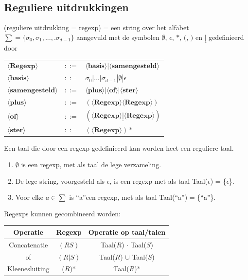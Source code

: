 \documentclass{report}
\begin{document}
\subsection{Reguliere uitdrukkingen}
(reguliere uitdrukking = regexp) = een string over het alfabet $\sum = \{\sigma_0, \sigma_1, ..., .\sigma_{d - 1}\}$ aangevuld met de symbolen $\emptyset$, $\epsilon$, $*$, $($, $)$ en $\underline{|}$ gedefinieerd door
\begin{table}[ht]
	\centering
	\begin{tabular}{l l l}
		$\langle \textbf{Regexp} \rangle$ & $::=$ & $\langle \textbf{basis} \rangle | \langle \textbf{samengesteld} \rangle$ \\
		$\langle \textbf{basis} \rangle$ & $::=$ & $\sigma_0 | ... | \sigma_{d - 1} | \emptyset | \epsilon$ \\
		$\langle \textbf{samengesteld} \rangle$ & $::=$ & $\langle \textbf{plus} \rangle  |  \langle \textbf{of} \rangle | \langle \textbf{ster} \rangle$ \\
		$\langle \textbf{plus} \rangle $ & $::=$ & $(\langle \textbf{Regexp} \rangle \langle \textbf{Regexp} \rangle)$ \\
		$\langle \textbf{of} \rangle $ & $::=$ & $(\langle \textbf{Regexp} \rangle \underline{|} \langle \textbf{Regexp} \rangle)$ \\
		$\langle \textbf{ster} \rangle $ & $::=$ & $(\langle \textbf{Regexp} \rangle)*$
	\end{tabular}
\end{table}
Een taal die door een regexp gedefinieerd kan worden heet een reguliere taal. 
\begin{enumerate}
	\item $\emptyset$ is een regexp, met als taal de lege verzameling.
	\item De lege string, voorgesteld als $\epsilon$, is een regexp met als taal Taal($\epsilon$) = \{$\epsilon$\}.
	\item Voor elke $a \in \sum$ is \textquotedblleft a\textquotedblright een regexp, met als taal Taal(\textquotedblleft a\textquotedblright ) = \{\textquotedblleft a\textquotedblright\}.
\end{enumerate}
Regexps kunnen gecombineerd worden:
\begin{table}[h]
	\centering
	\begin{tabular}{c c c }
		\hline
		Operatie & Regexp & Operatie op taal/talen \\
		\hline 
		Concatenatie & $(RS)$ & Taal($R$) $\cdot$ Taal($S$) \\
		of & $(R|S)$ & Taal($R$) $\cup$ Taal($S$)  \\
		Kleenesluiting & ($R$)* & Taal($R$)*
		 
	\end{tabular}
\end{table}
\end{document}
